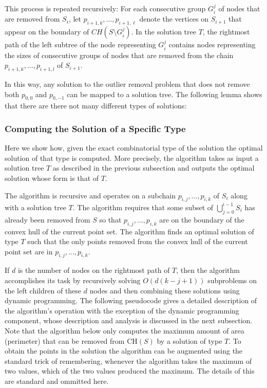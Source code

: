 \documentclass[lotsofwhite]{patmorin}
\newcommand{\ch}{\mathrm{CH}}
\begin{document}
This process is repeated recursively: For each consecutive group
$G_i^j$ of nodes that are removed from $S_i$, let $p_{i+1,k}, \ldots,
p_{i+1,\ell}$ denote the vertices on $S_{i+1}$ that appear on the
boundary of $CH(S \setminus G_i^j)$. In the solution tree $T$, the
rightmost path of the left subtree of the node representing $G_i^j$
contains nodes representing the sizes of consecutive groups of nodes
that are removed from the chain $p_{i+1,k}, \ldots, p_{i+1,l}$ of
$S_{i+1}$.


In this way, any solution to the outlier removal problem that does not
remove both $p_{0,0}$ and $p_{0,-1}$ can be mapped to a solution tree.
The following lemma shows that there are there not many different
types of solutions:



\subsubsection{Computing the Solution of a Specific Type}

Here we show how, given the exact combinatorial type of the solution
the optimal solution of that type is computed. More precisely, the
algorithm takes as input a solution tree $T$ as described in the
previous subsection and outputs the optimal solution whose form is
that of $T$.

The algorithm is recursive and operates on a subchain
$p_{i,j},\ldots,p_{i,k}$ of $S_i$ along with a solution tree $T$.  The
algorithm requires that some subset of $\bigcup_{j=0}^{i-1}S_i$ has
already been removed from $S$ so that $p_{i,j},\ldots,p_{i,k}$ are on
the boundary of the convex hull of the current point set.  The
algorithm finds an optimal solution of type $T$ such that the only
points removed from the convex hull of the current point set are in
$p_{i,j},\ldots,p_{i,k}$.

If $d$ is the number of nodes on the rightmost path of $T$, then the
algorithm accomplishes its task by recursively solving $O(d(k-j+1))$
subproblems on the left children of these $d$ nodes and then combining
these solutions using dynamic programming.  The following pseudocode
gives a detailed description of the algorithm's operation with the
exception of the dynamic programming component, whose description and
analysis is discussed in the next subsection.  Note that the algorithm
below only computes the maximum amount of area (perimeter) that can be
removed from $\ch(S)$ by a solution of type $T$.  To obtain the points
in the solution the algorithm can be augmented using the standard
trick of remembering, whenever the algorithm takes the maximum of two
values, which of the two values produced the maximum.  The details of
this are standard and ommitted here.
\end{document}
